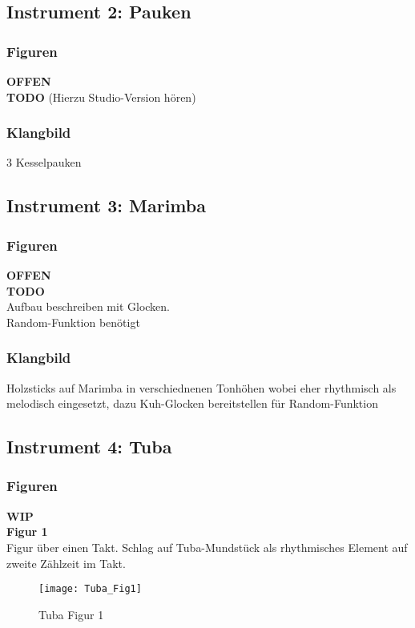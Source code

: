 \documentclass[
10pt, %
a4paper, %
oneside, %
headinclude,footinclude, %
BCOR5mm, %
]{scrartcl}
\begin{document}
\subsection{Instrument 2: Pauken}
\subsubsection{Figuren}
{\color{red}\textbf{OFFEN}} \\
{\color{red}\textbf{TODO}}
(Hierzu Studio-Version hören)\\

\subsubsection{Klangbild}
3 Kesselpauken

\subsection{Instrument 3: Marimba}
\subsubsection{Figuren}
{\color{red}\textbf{OFFEN}} \\
{\color{red}\textbf{TODO}}\\
Aufbau beschreiben mit Glocken.\\
Random-Funktion benötigt

\subsubsection{Klangbild}
Holzsticks auf Marimba in verschiednenen Tonhöhen wobei eher rhythmisch als melodisch eingesetzt, dazu Kuh-Glocken bereitstellen für Random-Funktion

\subsection{Instrument 4: Tuba}
\subsubsection{Figuren}
{\color{orange}\textbf{WIP}} \\

\noindent\textbf{Figur 1}\\
Figur über einen Takt. Schlag auf Tuba-Mundstück als rhythmisches Element auf zweite Zählzeit im Takt.\\
\begin{figure}[h]
	\centering 
	\texttt{[image: Tuba\_Fig1]} 
	\caption{Tuba Figur 1}
\end{figure}
\end{document}
